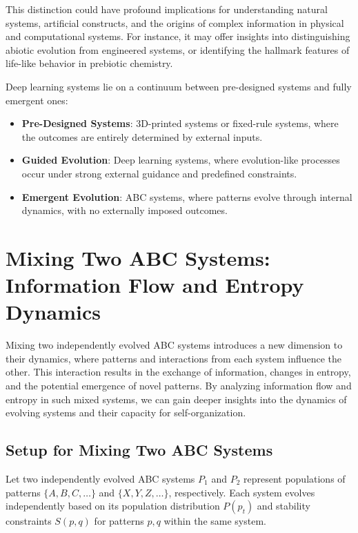 \documentclass[entropy,article,submit,pdftex,moreauthors]{Definitions/mdpi}
\begin{document}
This distinction could have profound implications for understanding natural systems, artificial constructs, and the origins of complex information in physical and computational systems. For instance, it may offer insights into distinguishing abiotic evolution from engineered systems, or identifying the hallmark features of life-like behavior in prebiotic chemistry.

Deep learning systems lie on a continuum between pre-designed systems and fully emergent ones:
\begin{itemize}
    \item \textbf{Pre-Designed Systems}: 3D-printed systems or fixed-rule systems, where the outcomes are entirely determined by external inputs.
    \item \textbf{Guided Evolution}: Deep learning systems, where evolution-like processes occur under strong external guidance and predefined constraints.
    \item \textbf{Emergent Evolution}: ABC systems, where patterns evolve through internal dynamics, with no externally imposed outcomes.
\end{itemize}

\section{Mixing Two ABC Systems: Information Flow and Entropy Dynamics}

Mixing two independently evolved ABC systems introduces a new dimension to their dynamics, where patterns and interactions from each system influence the other. This interaction results in the exchange of information, changes in entropy, and the potential emergence of novel patterns. By analyzing information flow and entropy in such mixed systems, we can gain deeper insights into the dynamics of evolving systems and their capacity for self-organization.

\subsection{Setup for Mixing Two ABC Systems}

Let two independently evolved ABC systems \( P_1 \) and \( P_2 \) represent populations of patterns \( \{A, B, C, \dots\} \) and \( \{X, Y, Z, \dots\} \), respectively. Each system evolves independently based on its population distribution \( P(p_t) \) and stability constraints \( S(p, q) \) for patterns \( p, q \) within the same system.
\end{document}
